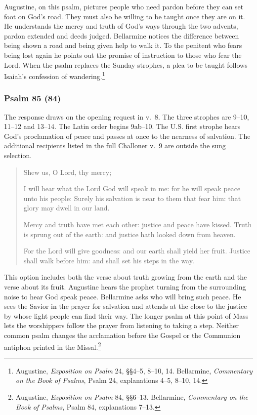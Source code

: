 Augustine, on this psalm, pictures people who need pardon before they can set foot on God's road. They must also be willing to be taught once they are on it. He understands the mercy and truth of God's ways through the two advents, pardon extended and deeds judged. Bellarmine notices the difference between being shown a road and being given help to walk it. To the penitent who fears being lost again he points out the promise of instruction to those who fear the Lord. When the psalm replaces the Sunday strophes, a plea to be taught follows Isaiah's confession of wandering.\footnote{Augustine, \textit{Exposition on Psalm} 24, §§4--5, 8--10, 14. Bellarmine, \textit{Commentary on the Book of Psalms}, Psalm 24, explanations 4--5, 8--10, 14.}

\subsubsection{Psalm 85 (84)}

The response draws on the opening request in v.~8. The three strophes are 9--10, 11--12 and 13--14. The Latin order begins 9ab--10. The U.S. first strophe hears God's proclamation of peace and passes at once to the nearness of salvation. The additional recipients listed in the full Challoner v.~9 are outside the sung selection.

\begin{quote}
Shew us, O Lord, thy mercy;

I will hear what the Lord God will speak in me: for he will speak peace unto his people: Surely his salvation is near to them that fear him: that glory may dwell in our land.

Mercy and truth have met each other: justice and peace have kissed. Truth is sprung out of the earth: and justice hath looked down from heaven.

For the Lord will give goodness: and our earth shall yield her fruit. Justice shall walk before him: and shall set his steps in the way.
\end{quote}

This option includes both the verse about truth growing from the earth and the verse about its fruit. Augustine hears the prophet turning from the surrounding noise to hear God speak peace. Bellarmine asks who will bring such peace. He sees the Savior in the prayer for salvation and attends at the close to the justice by whose light people can find their way. The longer psalm at this point of Mass lets the worshippers follow the prayer from listening to taking a step. Neither common psalm changes the acclamation before the Gospel or the Communion antiphon printed in the Missal.\footnote{Augustine, \textit{Exposition on Psalm} 84, §§6--13. Bellarmine, \textit{Commentary on the Book of Psalms}, Psalm 84, explanations 7--13.}

